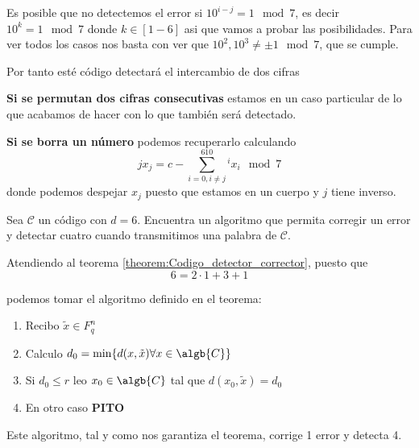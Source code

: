 \begin{problem}[6]
Es posible que no detectemos el error si $10^{i-j}=1 \mod 7$, es decir $10^k=1 \mod 7$ donde $k\in[1-6]$ asi que vamos a probar las posibilidades. Para ver todos los casos nos basta con ver que $10^2,10^3 \neq \pm 1 \mod 7$, que se cumple.

Por tanto esté código detectará el intercambio de dos cifras

\textbf{Si se permutan dos cifras consecutivas} estamos en un caso particular de lo que acabamos de hacer con lo que también será detectado.

\textbf{Si se borra un número} podemos recuperarlo calculando
\[jx_j = c-\sum_{i=0, i\neq j}^610^ix_i \mod 7 \]
donde podemos despejar $x_j$ puesto que estamos en un cuerpo y $j$ tiene inverso.

\end{problem}


\begin{problem}[7] Sea $\mathcal C$ un código con $d=6$. Encuentra un algoritmo que permita   corregir un error y detectar cuatro cuando transmitimos una palabra de $\mathcal C$.
\solution


Atendiendo al teorema \ref{theorem:Codigo_detector_corrector}, puesto que
\[6 = 2\cdot 1 + 3 + 1\]

podemos tomar el algoritmo definido en el teorema:

\begin{enumerate}
\item Recibo $\tilde{x} \in F_q^n$
\item Calculo $d_0 = \min\{d(x,\tilde{x}) \forall x \in \algb{C}\}$
\item Si $d_0 \leq r$ leo $x_0 \in \algb{C}$ tal que $d(x_0,\tilde{x})=d_0$
\item En otro caso \textbf{PITO}
\end{enumerate}

Este algoritmo, tal y como nos garantiza el teorema, corrige 1 error y detecta 4.
\end{problem}


